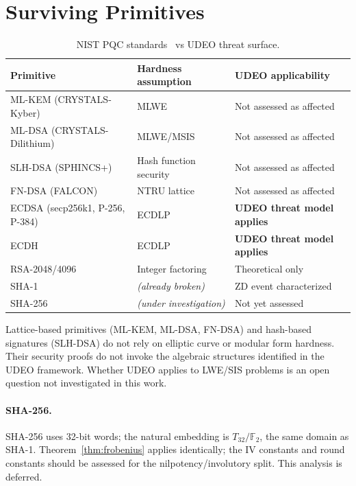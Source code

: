 \documentclass[runningheads]{llncs}
\theoremstyle{plain}
\theoremstyle{definition}
\newcommand{\GFtwo}{\mathbb{F}_2}
\begin{document}
\section{Surviving Primitives}
\label{sec:surviving}

\begin{table}[h]
\centering
\caption{NIST PQC standards~\cite{NIST-PQC} vs UDEO threat surface.}
\label{tab:pqc}
\begin{tabular}{lll}
\toprule
Primitive & Hardness assumption & UDEO applicability \\
\midrule
ML-KEM (CRYSTALS-Kyber) & MLWE & Not assessed as affected \\
ML-DSA (CRYSTALS-Dilithium) & MLWE/MSIS & Not assessed as affected \\
SLH-DSA (SPHINCS+) & Hash function security & Not assessed as affected \\
FN-DSA (FALCON) & NTRU lattice & Not assessed as affected \\
\midrule
ECDSA (secp256k1, P-256, P-384) & ECDLP & \textbf{UDEO threat model applies} \\
ECDH & ECDLP & \textbf{UDEO threat model applies} \\
RSA-2048/4096 & Integer factoring & Theoretical only \\
SHA-1 & \emph{(already broken)} & ZD event characterized \\
SHA-256 & \emph{(under investigation)} & Not yet assessed \\
\bottomrule
\end{tabular}
\end{table}

Lattice-based primitives (ML-KEM, ML-DSA, FN-DSA) and hash-based signatures
(SLH-DSA) do not rely on elliptic curve or modular form hardness. Their
security proofs do not invoke the algebraic structures identified in the
UDEO framework. Whether UDEO applies to LWE/SIS problems is an open question
not investigated in this work.

\paragraph{SHA-256.} SHA-256 uses 32-bit words; the natural embedding is
$T_{32}/\GFtwo$, the same domain as SHA-1. Theorem~\ref{thm:frobenius}
applies identically; the IV constants and round constants should be assessed
for the nilpotency/involutory split. This analysis is deferred.
\end{document}
